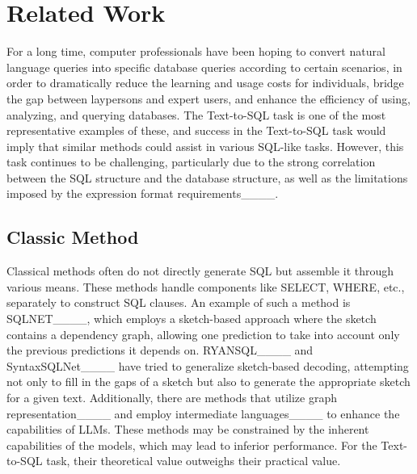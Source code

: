 \section{Related Work}
For a long time, computer professionals have been hoping to convert natural language queries into specific database queries according to certain scenarios, in order to dramatically reduce the learning and usage costs for individuals, bridge the gap between laypersons and expert users, and enhance the efficiency of using, analyzing, and querying databases. The Text-to-SQL task is one of the most representative examples of these, and success in the Text-to-SQL task would imply that similar methods could assist in various SQL-like tasks. However, this task continues to be challenging, particularly due to the strong correlation between the SQL structure and the database structure, as well as the limitations imposed by the expression format requirements____.

\subsection{Classic Method}
Classical methods often do not directly generate SQL but assemble it through various means. These methods handle components like SELECT, WHERE, etc., separately to construct SQL clauses. An example of such a method is SQLNET____, which employs a sketch-based approach where the sketch contains a dependency graph, allowing one prediction to take into account only the previous predictions it depends on. RYANSQL____ and SyntaxSQLNet____ have tried to generalize sketch-based decoding, attempting not only to fill in the gaps of a sketch but also to generate the appropriate sketch for a given text. Additionally, there are methods that utilize graph representation____ and employ intermediate languages____ to enhance the capabilities of LLMs. These methods may be constrained by the inherent capabilities of the models, which may lead to inferior performance. For the Text-to-SQL task, their theoretical value outweighs their practical value.

